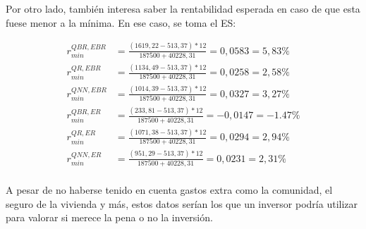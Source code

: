 \documentclass[11pt]{book}
\newcommand{\clearemptydoublepage}{\newpage{\pagestyle{empty}\cleardoublepage}}
\newcommand{\sectionmarkwithoutsections}[1]{\markright{#1}}
\theoremstyle{plain} %
\theoremstyle{definition} %
\begin{document}
Por otro lado, también interesa saber la rentabilidad esperada en caso de 
que esta fuese menor a la mínima. En ese caso, se toma el ES:

\begin{align*}
    r_{min}^{QBR, EBR} &= \frac{(1619,22 - 513,37)*12}{187500+40228,31} = 0,0583 = 5,83\% \\
    r_{min}^{QR, EBR} &= \frac{(1134,49- 513,37)*12}{187500+40228,31} = 0,0258 = 2,58 \% \\
    r_{min}^{QNN, EBR} &= \frac{(1014,39 - 513,37)*12}{187500+40228,31} = 0,0327 = 3,27\% \\
    r_{min}^{QBR, ER} &= \frac{(233,81 - 513,37)*12}{187500+40228,31} = -0,0147 = -1.47\% \\
    r_{min}^{QR, ER} &= \frac{(1071,38 - 513,37)*12}{187500+40228,31} = 0,0294 = 2,94 \% \\
    r_{min}^{QNN, ER} &= \frac{(951,29 - 513,37)*12}{187500+40228,31} = 0,0231 = 2,31\% \\
\end{align*}

A pesar de no haberse tenido en cuenta gastos extra como la 
comunidad, el seguro de la vivienda y más, estos datos serían los que un
inversor podría utilizar para valorar si merece la pena o no la inversión. 
\clearemptydoublepage

\backmatter                      %



\chaptermark{\bibname}
\sectionmarkwithoutsections{\bibname}
\end{document}
